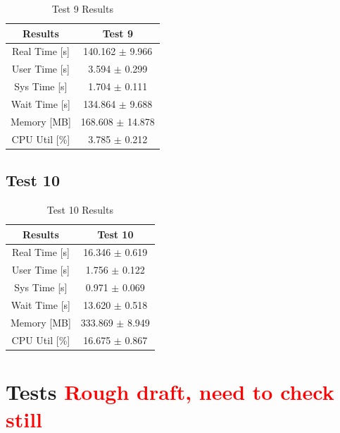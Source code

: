 \documentclass{article}
\begin{document}
\begin{table}[h!]
    \centering
    \begin{tabular}{cc}
        \hline
        \textbf{Results} & Test 9                \\ \hline
        Real Time [s]    &  140.162 $\pm$ 9.966  \\
        User Time [s]    &  3.594   $\pm$ 0.299  \\
        Sys Time [s]     &  1.704   $\pm$ 0.111  \\
        Wait Time [s]    &  134.864 $\pm$ 9.688  \\
        Memory [MB]      &  168.608 $\pm$ 14.878 \\
        CPU Util [\%]    &  3.785   $\pm$ 0.212  \\
        \hline
    \end{tabular}
    \caption{Test 9 Results}
    \label{tab:T9_Results}
\end{table}



\subsection{Test 10}

\begin{table}[h!]
    \centering
    \begin{tabular}{cc}
        \hline
        \textbf{Results} & Test 10                \\ \hline
        Real Time [s]    &  16.346  $\pm$ 0.619  \\
        User Time [s]    &  1.756   $\pm$ 0.122  \\
        Sys Time [s]     &  0.971   $\pm$ 0.069  \\
        Wait Time [s]    &  13.620  $\pm$ 0.518  \\
        Memory [MB]      &  333.869 $\pm$ 8.949 \\
        CPU Util [\%]    &  16.675  $\pm$ 0.867  \\
        \hline
    \end{tabular}
    \caption{Test 10 Results}
    \label{tab:T10_Results}
\end{table}
 


\section{Tests \textcolor{red}{Rough draft, need to check still}}
\end{document}
